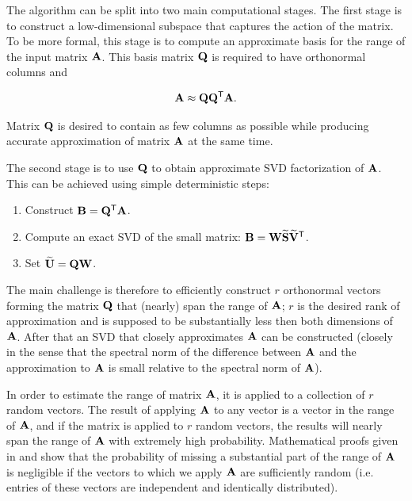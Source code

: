 The algorithm can be split into two main computational stages. The first stage is to construct a low-dimensional subspace that captures the action of the matrix. To be more formal, this stage is to compute an approximate basis for the range of the input matrix $\mathbf{A}$. This basis matrix $\mathbf{Q}$ is required to have orthonormal columns and

\begin{equation}
\mathbf{A} \approx \mathbf{Q} \mathbf{Q}^{\mathsf{T}} \mathbf{A}.
\end{equation}

\noindent
Matrix $\mathbf{Q}$ is desired to contain as few columns as possible while producing accurate approximation of matrix $\mathbf{A}$ at the same time.

The second stage is to use $\mathbf{Q}$ to obtain approximate SVD factorization of $\mathbf{A}$. This can be achieved using simple deterministic steps:

\begin{enumerate}
\item Construct $\mathbf{B} = \mathbf{Q}^{\mathsf{T}} \mathbf{A}$.
\item Compute an exact SVD of the small matrix: $\mathbf{B}=\mathbf{W}\mathbf{\widetilde{S}}\mathbf{\widetilde{V}}^{\mathsf{T}}$.
\item Set $\mathbf{\widetilde{U}}=\mathbf{Q}\mathbf{W}$.
\end{enumerate}

The main challenge is therefore to efficiently construct $r$ orthonormal vectors forming the matrix $\mathbf{Q}$ that (nearly) span the range of $\mathbf{A}$; $r$ is the desired rank of approximation and is supposed to be substantially less then both dimensions of $\mathbf{A}$. After that an SVD that closely approximates $\mathbf{A}$ can be constructed (closely in the sense that the spectral norm of the difference between $\mathbf{A}$ and the approximation to $\mathbf{A}$ is small relative to the spectral norm of $\mathbf{A}$).

In order to estimate the range of matrix $\mathbf{A}$, it is applied to a collection of $r$ random vectors. The result of applying $\mathbf{A}$ to any vector is a vector in the range of $\mathbf{A}$, and if the matrix is applied to $r$ random vectors, the results will nearly span the range of $\mathbf{A}$ with extremely high probability. Mathematical proofs given in \cite{Halko2011} and \cite{Witten2015} show that the probability of missing a substantial part of the range of $\mathbf{A}$ is negligible if the vectors to which we apply $\mathbf{A}$ are sufficiently random (i.e. entries of these vectors are independent and identically distributed).

